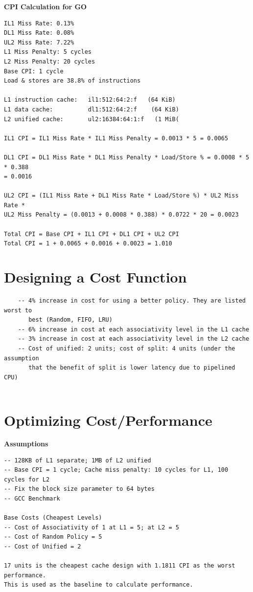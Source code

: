 \documentclass[twocolumn]{article}
\begin{document}
\textbf{CPI Calculation for GO}
\begin{lstlisting}
IL1 Miss Rate: 0.13%
DL1 Miss Rate: 0.08%
UL2 Miss Rate: 7.22%
L1 Miss Penalty: 5 cycles
L2 Miss Penalty: 20 cycles
Base CPI: 1 cycle
Load & stores are 38.8% of instructions

L1 instruction cache:   il1:512:64:2:f   (64 KiB)
L1 data cache:          dl1:512:64:2:f    (64 KiB)
L2 unified cache:       ul2:16384:64:1:f   (1 MiB(

IL1 CPI = IL1 Miss Rate * IL1 Miss Penalty = 0.0013 * 5 = 0.0065

DL1 CPI = DL1 Miss Rate * DL1 Miss Penalty * Load/Store % = 0.0008 * 5 * 0.388
= 0.0016

UL2 CPI = (IL1 Miss Rate + DL1 Miss Rate * Load/Store %) * UL2 Miss Rate * 
UL2 Miss Penalty = (0.0013 + 0.0008 * 0.388) * 0.0722 * 20 = 0.0023

Total CPI = Base CPI + IL1 CPI + DL1 CPI + UL2 CPI
Total CPI = 1 + 0.0065 + 0.0016 + 0.0023 = 1.010
\end{lstlisting}


\newpage

\section{Designing a Cost Function}

\begin{lstlisting}
    -- 4% increase in cost for using a better policy. They are listed worst to
       best (Random, FIFO, LRU)
    -- 6% increase in cost at each associativity level in the L1 cache
    -- 3% increase in cost at each associativity level in the L2 cache
    -- Cost of unified: 2 units; cost of split: 4 units (under the assumption 
       that the benefit of split is lower latency due to pipelined CPU)
    
\end{lstlisting}

\section{Optimizing Cost/Performance}
\textbf{Assumptions}
\begin{lstlisting}
-- 128KB of L1 separate; 1MB of L2 unified
-- Base CPI = 1 cycle; Cache miss penalty: 10 cycles for L1, 100 cycles for L2
-- Fix the block size parameter to 64 bytes
-- GCC Benchmark

Base Costs (Cheapest Levels)
-- Cost of Associativity of 1 at L1 = 5; at L2 = 5
-- Cost of Random Policy = 5
-- Cost of Unified = 2

17 units is the cheapest cache design with 1.1811 CPI as the worst performance. 
This is used as the baseline to calculate performance.
\end{lstlisting}
\end{document}
